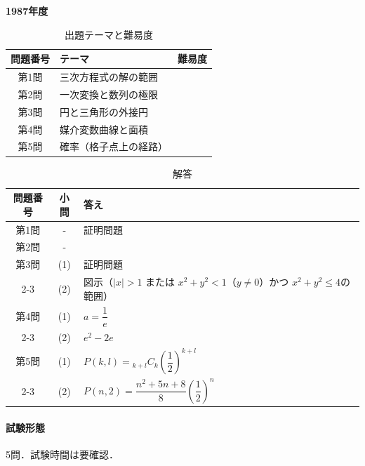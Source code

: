 \documentclass[../../main.tex]{subfiles}
\begin{document}
\begin{center}
  {\fontsize{48pt}{58pt}\selectfont \textbf{1987}\normalsize\textbf{年度}}
\end{center}

\begin{table}[htb]
  \centering
  \caption{出題テーマと難易度}
  \begin{tabular}{|c|p{9cm}|c|}
    \hline
    \textbf{問題番号} & \textbf{テーマ} & \textbf{難易度} \\
    \hline
    第1問 & 三次方程式の解の範囲 & \\
    \hline
    第2問 & 一次変換と数列の極限 & \\
    \hline
    第3問 & 円と三角形の外接円 & \\
    \hline
    第4問 & 媒介変数曲線と面積 & \\
    \hline
    第5問 & 確率（格子点上の経路） & \\
    \hline
  \end{tabular}
\end{table}

\begin{table}[htb]
  \centering
  \caption{解答}
  \renewcommand{\arraystretch}{1.4}
  \begin{tabular}{|c|c|p{9cm}|}
    \hline
    \textbf{問題番号} & \textbf{小問} & \textbf{答え} \\
    \hline
    第1問 & - & 証明問題 \\
    \hline
    第2問 & - &  \\
    \hline
    第3問 & (1) & 証明問題 \\
    \cline{2-3}
    & (2) & 図示（$|x|>1$ または $x^2+y^2<1$（$y\ne0$）かつ $x^2+y^2\le4$の範囲） \\
    \hline
    第4問 & (1) & $a=\dfrac{1}{e}$ \\
    \cline{2-3}
    & (2) & $e^2-2e$ \\
    \hline
    第5問 & (1) & $P(k,l)={}_{k+l}C_k\left(\dfrac{1}{2}\right)^{k+l}$ \\
    \cline{2-3}
    & (2) & $P(n,2)=\dfrac{n^2+5n+8}{8}\left(\dfrac{1}{2}\right)^n$ \\
    \hline
  \end{tabular}
\end{table}

\paragraph{試験形態}
5問．試験時間は要確認．
\end{document}

